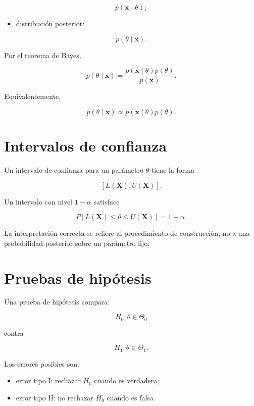 \documentclass[
  spanish,
  10.5pt,
  letterpaper,
  DIV=11,
  numbers=noendperiod,
  oneside,
  open=any]{scrreprt}
\providecommand{\tightlist}{%
  \setlength{\itemsep}{0pt}\setlength{\parskip}{0pt}}
\theoremstyle{definition}
\theoremstyle{definition}
\theoremstyle{plain}
\theoremstyle{remark}
\begin{document}
\[
p(\mathbf{x}\mid\theta);
\]

\begin{itemize}
\tightlist
\item
  distribución posterior:
\end{itemize}

\[
p(\theta\mid\mathbf{x}).
\]

Por el teorema de Bayes,

\[
p(\theta\mid\mathbf{x})
=
\frac{
p(\mathbf{x}\mid\theta)p(\theta)
}{
p(\mathbf{x})
}.
\]

Equivalentemente,

\[
p(\theta\mid\mathbf{x})
\propto
p(\mathbf{x}\mid\theta)p(\theta).
\]

\section*{Intervalos de confianza}\label{intervalos-de-confianza}


Un intervalo de confianza para un parámetro \(\theta\) tiene la forma

\[
[L(\mathbf{X}),U(\mathbf{X})].
\]

Un intervalo con nivel \(1-\alpha\) satisface

\[
P
\left[
L(\mathbf{X})
\leq
\theta
\leq
U(\mathbf{X})
\right]
=
1-\alpha.
\]

La interpretación correcta se refiere al procedimiento de construcción,
no a una probabilidad posterior sobre un parámetro fijo.

\section*{Pruebas de hipótesis}\label{pruebas-de-hipuxf3tesis}


Una prueba de hipótesis compara:

\[
H_0:\theta\in\Theta_0
\]

contra

\[
H_1:\theta\in\Theta_1.
\]

Los errores posibles son:

\begin{itemize}
\tightlist
\item
  error tipo I: rechazar \(H_0\) cuando es verdadera;
\item
  error tipo II: no rechazar \(H_0\) cuando es falsa.
\end{itemize}
\end{document}
